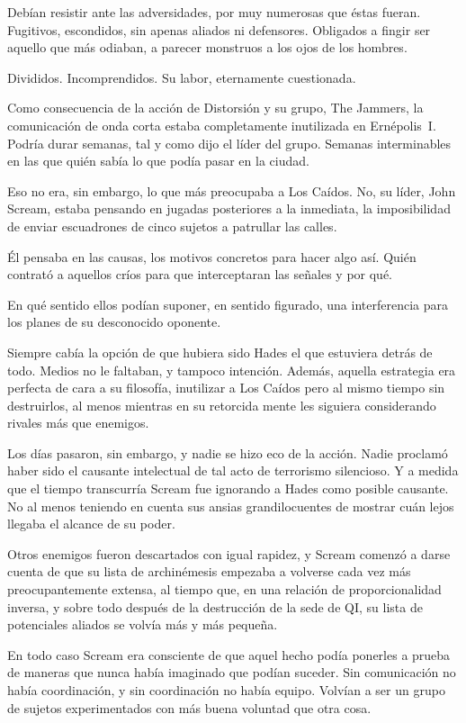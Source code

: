 Debían resistir ante las adversidades, por muy numerosas que éstas fueran. Fugitivos, escondidos, sin apenas aliados ni defensores. Obligados a fingir ser aquello que más odiaban, a parecer monstruos a los ojos de los hombres.

Divididos. Incomprendidos. Su labor, eternamente cuestionada.

\fancyparbreak
Como consecuencia de la acción de Distorsión y su grupo, The Jammers, la comunicación de onda corta estaba completamente inutilizada en Ernépolis~I. Podría durar semanas, tal y como dijo el líder del grupo. Semanas interminables en las que quién sabía lo que podía pasar en la ciudad.

Eso no era, sin embargo, lo que más preocupaba a Los Caídos. No, su líder, John Scream, estaba pensando en jugadas posteriores a la inmediata, la imposibilidad de enviar escuadrones de cinco sujetos a patrullar las calles.

Él pensaba en las causas, los motivos concretos para hacer algo así. Quién contrató a aquellos críos para que interceptaran las señales y por qué.

En qué sentido ellos podían suponer, en sentido figurado, una interferencia para los planes de su desconocido oponente.

Siempre cabía la opción de que hubiera sido Hades el que estuviera detrás de todo. Medios no le faltaban, y tampoco intención. Además, aquella estrategia era perfecta de cara a su filosofía, inutilizar a Los Caídos pero al mismo tiempo sin destruirlos, al menos mientras en su retorcida mente les siguiera considerando rivales más que enemigos.

Los días pasaron, sin embargo, y nadie se hizo eco de la acción. Nadie proclamó haber sido el causante intelectual de tal acto de terrorismo silencioso. Y a medida que el tiempo transcurría Scream fue ignorando a Hades como posible causante. No al menos teniendo en cuenta sus ansias grandilocuentes de mostrar cuán lejos llegaba el alcance de su poder.

Otros enemigos fueron descartados con igual rapidez, y Scream comenzó a darse cuenta de que su lista de archinémesis empezaba a volverse cada vez más preocupantemente extensa, al tiempo que, en una relación de proporcionalidad inversa, y sobre todo después de la destrucción de la sede de QI, su lista de potenciales aliados se volvía más y más pequeña.

En todo caso Scream era consciente de que aquel hecho podía ponerles a prueba de maneras que nunca había imaginado que podían suceder. Sin comunicación no había coordinación, y sin coordinación no había equipo. Volvían a ser un grupo de sujetos experimentados con más buena voluntad que otra cosa.

